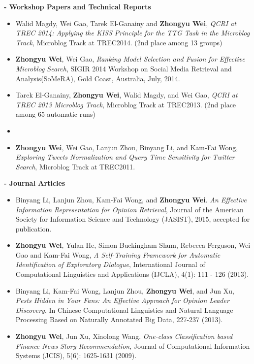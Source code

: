 \documentclass[9.5pt]{article}
\begin{document}
\textbf{- Workshop Papers and Technical Reports}
\begin{itemize}
     \item Walid Magdy, Wei Gao, Tarek El-Ganainy and  \textbf{Zhongyu Wei}, \emph{QCRI at TREC 2014: Applying the KISS Principle for the TTG Task in the Microblog Track}, Microblog Track at TREC2014. (2nd place among 13 groups)
    \item \textbf{Zhongyu Wei}, Wei Gao, \emph{Ranking Model Selection and Fusion for Effective Microblog Search}, SIGIR 2014 Workshop on Social Media Retrieval and Analysis(SoMeRA), Gold Coast, Australia, July, 2014.
    \item Tarek El-Ganainy, \textbf{Zhongyu Wei}, Walid Magdy, and Wei Gao, \emph{QCRI at TREC 2013 Microblog Track}, Microblog Track at TREC2013. (2nd place among 65 automatic runs)
    \item {}
     \item  \textbf{Zhongyu Wei}, Wei Gao, Lanjun Zhou, Binyang Li, and Kam-Fai Wong, \emph{Exploring Tweets Normalization and Query Time Sensitivity for Twitter Search}, Microblog Track at TREC2011.
\end{itemize}

\textbf{- Journal Articles}
\begin{itemize}
       \item Binyang Li, Lanjun Zhou, Kam-Fai Wong, and \textbf{Zhongyu Wei}. \emph{An Effective Information Representation for Opinion Retrieval}, Journal of the American Society for Information Science and Technology (JASIST), 2015, accepted for publication.
       \item \textbf{Zhongyu Wei}, Yulan He, Simon Buckingham Shum, Rebecca Ferguson, Wei Gao and Kam-Fai Wong, \emph{A Self-Training Framework for Automatic Identification of Exploratory Dialogue}, International Journal of Computational Linguistics and Applications (IJCLA), 4(1): 111 - 126 (2013).
        \item Binyang Li, Kam-Fai Wong, Lanjun Zhou, \textbf{Zhongyu Wei}, and Jun Xu, \emph{Pests Hidden in Your Fans: An Effective Approach for Opinion Leader Discovery}, In Chinese Computational Linguistics and Natural Language Processing Based on Naturally Annotated Big Data, 227-237 (2013).
        \item \textbf{Zhongyu Wei}, Jun Xu, Xiaolong Wang. \emph{One-class Classification based Finance News Story Recommendation}, Journal of Computational Information Systems (JCIS), 5(6): 1625-1631 (2009).
 \end{itemize}
\end{document}

